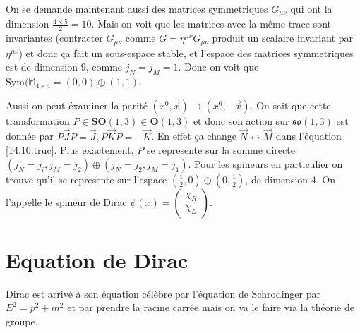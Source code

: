 \documentclass[10pt]{report}
\begin{document}
On se demande maintenant aussi des matrices symmetriques $G_{\mu\nu}$ qui ont la dimension $\frac{4 \times 5}{2} = 10$. Mais on voit que les matrices avec la m\^eme trace sont invariantes (contracter $G_{\mu\nu}$ comme $G = \eta^{\mu\nu}G_{\mu\nu}$ produit un scalaire invariant par $\eta^{\mu\nu}$) et donc \c{c}a fait un sous-espace stable, et l'espace des matrices symmetriques est de dimension $9$, comme $j_N = j_M = 1$. Donc on voit que $\mathrm{Sym}(\mathbb{M}_{4\times 4} = (0,0) \oplus (1,1)$. 

Aussi on peut \'examiner la parit\'e $\left( x^0, \vec{x} \right) \to (x^0, -\vec{x})$. On sait que cette transformation $P \in \mathbf{SO}(1,3) \in \mathbf{O}(1,3)$ et donc son action sur $\mathfrak{so}(1,3)$ est donn\'ee par $P\vec{J}P = \vec{J}, P \vec{K}P = -\vec{K}$. En effet \c{c}a change $\vec{N} \leftrightarrow \vec{M}$ dans l'\'equation \eqref{14.10.truc}. Plus exactement, $P$ se represente sur la somme directe $\left( j_N = j_i, j_M = j_2 \right) \oplus \left( j_N = j_2, j_M = j_1 \right)$. Pour les spineurs en particulier on trouve qu'il se represente sur l'espace $\left( \frac{1}{2},0 \right) \oplus \left( 0, \frac{1}{2} \right)$, de dimension $4$. On l'appelle le spineur de Dirac $\psi(x) = \begin{pmatrix} \chi_R\\ \chi_L \end{pmatrix} $. 

\section{Equation de Dirac}

Dirac est arriv\'e \`a son \'equation c\'el\`ebre par l'\'equation de Schrodinger par $E^2 = p^2 + m^2$ et par prendre la racine carr\'ee mais on va le faire via la th\'eorie de groupe.
\end{document}

